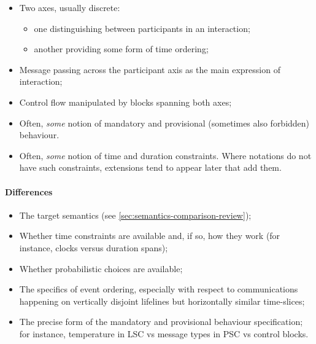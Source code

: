 \begin{itemize}
\item
	Two axes, usually discrete:
	\begin{itemize}
		\item
			one distinguishing between participants in an interaction;
		\item
			another providing some form of time ordering;
	\end{itemize}
\item
	Message passing across the participant axis as the main expression of
	interaction;
\item
	Control flow manipulated by blocks 
	spanning both axes;
\item
  Often, \emph{some} notion of mandatory and provisional
  (sometimes also forbidden) behaviour.
\item
	Often, \emph{some} notion of time and duration constraints.  Where notations
	do not have such constraints, extensions tend to appear later that add them.
\end{itemize}

\paragraph{Differences}

\begin{itemize}
\item
	The target semantics (see \cref{sec:semantics-comparison-review});
\item
	Whether time constraints are available and, if so, how they work
	(for instance, clocks versus duration spans);
\item
  Whether probabilistic choices are available;
\item
	The specifics of event ordering, especially with respect to communications
	happening on vertically disjoint lifelines but horizontally
	similar time-slices;
\item
	The precise form of the mandatory and provisional
	behaviour specification; for instance, temperature in LSC
	vs message types in PSC vs control blocks.
\end{itemize}


